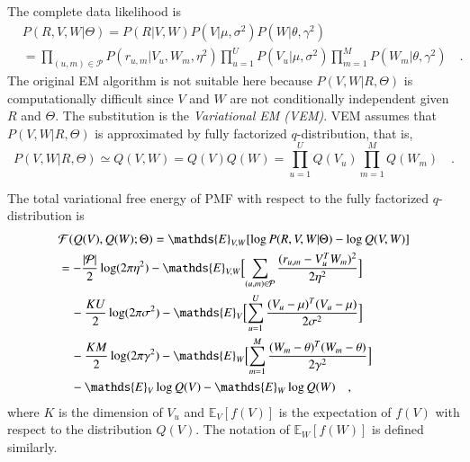 \documentclass{article}
\begin{document}

The complete data likelihood is
\begin{equation}\label{likelihood}
\begin{split}
&P(R,V,W|\Theta) = P(R|V,W)P(V|\mu, \sigma^2)P(W|\theta, \gamma^2) \\
&=\prod_{(u,m)\in\mathcal{P}} P(r_{u,m}|V_u, W_m, \eta^2)
\prod_{u=1}^U P(V_u|\mu, \sigma^2)
\prod_{m=1}^M P(W_m|\theta, \gamma^2) \quad .
\end{split}
\end{equation}
The original EM algorithm is not suitable here because
$P(V,W|R,\Theta)$ is computationally difficult since $V$ and $W$ are
not conditionally independent given $R$ and $\Theta$.  The substitution is
the \textit{Variational EM (VEM)}.
VEM assumes that $P(V,W|R,\Theta)$ is approximated by fully factorized $q$-distribution, that is,
\begin{equation}\label{qdist}
    P(V,W|R,\Theta) \simeq Q(V,W) = Q(V)Q(W)
    = \prod_{u=1}^UQ(V_u)\prod_{m=1}^MQ(W_m)  \quad .
\end{equation}

The total variational free energy of PMF with respect to the fully factorized
$q$-distribution is
\begin{equation}
    \begin{aligned}
        &\mathcal{F}(Q(V),Q(W);\Theta) =
        \mathds{E}_{V,W}[\log P(R,V,W|\Theta)-\log Q(V,W)]  \\
        &= -\frac{|\mathcal{P}|}{2}\log (2\pi\eta^2)
        - \mathds{E}_{V,W}\Bigl[\sum_{(u,m)\in\mathcal{P}}\frac{(r_{u,m}-V_u^TW_m)^2}{2\eta^2}\Bigr] \\
        &\quad- \frac{KU}{2}\log(2\pi\sigma^2)
        - \mathds{E}_{V} \Bigl[ \sum_{u=1}^U \frac{(V_u-\mu)^T(V_u-\mu)}{2\sigma^2}\Bigr]\\
        &\quad- \frac{KM}{2} \log(2\pi\gamma^2)
        - \mathds{E}_{W} \Bigl[ \sum_{m=1}^M \frac{(W_m-\theta)^T(W_m-\theta)}{2\gamma^2}\Bigr]\\
        &\quad -\mathds{E}_V\log Q(V) -\mathds{E}_W\log Q(W) \quad ,
    \end{aligned}
\end{equation}
where $K$ is the dimension of $V_u$ and $\mathds{E}_V[f(V)]$ is the expectation of $f(V)$
with respect to the distribution $Q(V)$.
The notation of $\mathds{E}_W[f(W)]$ is defined similarly.
\end{document}
